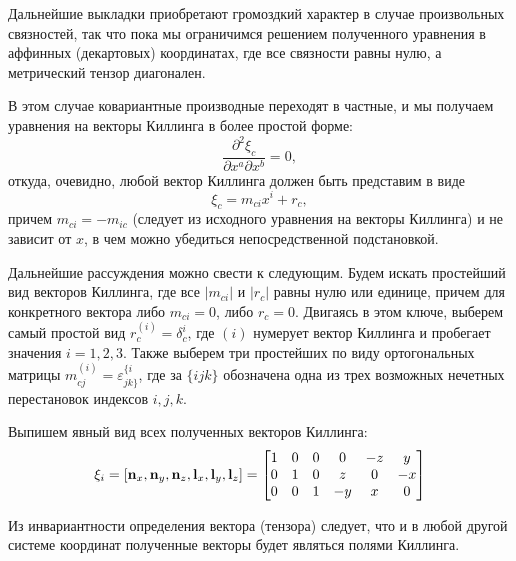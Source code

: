 \documentclass[12pt,a4paper]{article}
\begin{document}
        Дальнейшие выкладки приобретают громоздкий характер в случае произвольных связностей, так что пока мы ограничимся решением полученного уравнения в аффинных (декартовых) координатах, где все связности равны нулю, а метрический тензор диагонален.

        В этом случае ковариантные производные переходят в частные, и мы получаем уравнения на векторы Киллинга в более простой форме:
        \begin{equation}
            \frac{\partial^2 \xi_c}{\partial x^a \partial x^b} = 0,
        \end{equation}
        откуда, очевидно, любой вектор Киллинга должен быть представим в виде
        \begin{equation}
            \xi_c = m_{ci} x^i + r_c,
        \end{equation}
        причем $m_{ci} = - m_{ic}$ (следует из исходного уравнения на векторы Киллинга) и не зависит от $x$, в чем можно убедиться непосредственной подстановкой.

        Дальнейшие рассуждения можно свести к следующим. Будем искать простейший вид векторов Киллинга, где все $|m_{ci}|$ и $|r_c|$ равны нулю или единице, причем для конкретного вектора либо $m_{ci} = 0$, либо $r_c = 0$. Двигаясь в этом ключе, выберем самый простой вид $r^{(i)}_c = \delta^i_c$, где $(i)$ нумерует вектор Киллинга и пробегает значения $i = 1,2,3$. Также выберем три простейших по виду ортогональных матрицы $m^{(i)}_{cj} = \varepsilon^{\{i}_{jk\}}$, где за $\{ijk\}$ обозначена одна из трех возможных нечетных перестановок индексов $i,j,k$.

        Выпишем явный вид всех полученных векторов Киллинга:
        \begin{equation}
            \mathbf{\xi}_i
            =
            \left[
                \mathbf{n}_x, \mathbf{n}_y, \mathbf{n}_z,
                \mathbf{l}_x, \mathbf{l}_y, \mathbf{l}_z
            \right]
            =
            \begin{bmatrix}
                1 & 0 & 0 & 0  & -z & y  \\
                0 & 1 & 0 & z  & 0  & -x \\
                0 & 0 & 1 & -y & x  & 0
            \end{bmatrix}
        \end{equation}

        Из инвариантности определения вектора (тензора) следует, что и в любой другой системе координат полученные векторы будет являться полями Киллинга.
\end{document}
